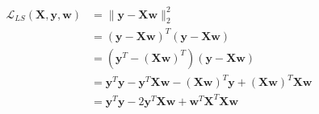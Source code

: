 \newcommand{\matrix}[1]{\mathbf{#1}}
\newcommand{\vector}[1]{\mathbf{#1}}
\newcommand{\X}{\matrix{X}}
\newcommand{\y}{\vector{y}}
\newcommand{\w}{\vector{w}}
\begin{align*}
\mathcal{L}_{LS}(\X,\y,\w) &= \|\y - \X\w\|_2^2 \\
&= (\y - \X\w)^T (\y - \X\w) \\
&= (\y^T - (\X\w)^T) (\y - \X\w) \\
&= \y^T\y - \y^T\X\w - (\X\w)^T\y + (\X\w)^T\X\w \\
&= \y^T\y - 2\y^T\X\w + \w^T\X^T\X\w
\end{align*}
